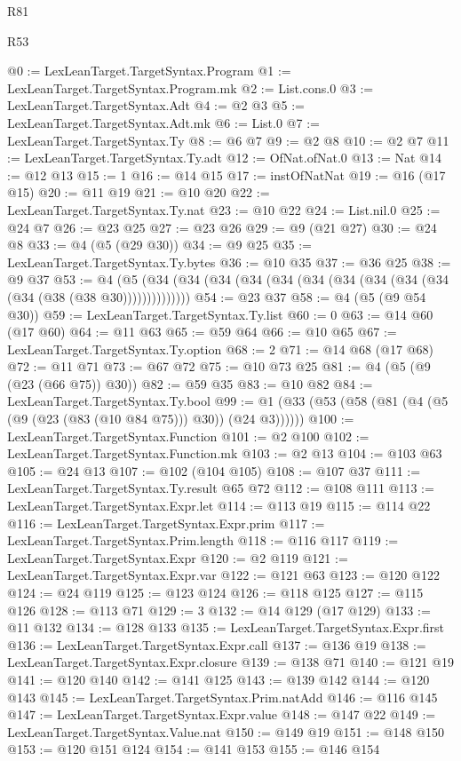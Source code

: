 \begin{lexlean}{R81}
\begin{lexlean}{R53}
\begin{coremodule}
{{{{{{{{{{{{{{{{{{{{{{{{{{{{{{{{{{{{{{{{{{{{{{{{{{{{{{{{{{{{{{{{{{{{{{{{{{{{{{{{{{{{{{{{{{{{{{{{{{{{{{{{{{{{{{{{@0 := LexLeanTarget.TargetSyntax.Program
@1 := LexLeanTarget.TargetSyntax.Program.mk
@2 := List.cons.{0}
@3 := LexLeanTarget.TargetSyntax.Adt
@4 := @2 @3
@5 := LexLeanTarget.TargetSyntax.Adt.mk
@6 := List.{0}
@7 := LexLeanTarget.TargetSyntax.Ty
@8 := @6 @7
@9 := @2 @8
@10 := @2 @7
@11 := LexLeanTarget.TargetSyntax.Ty.adt
@12 := OfNat.ofNat.{0}
@13 := Nat
@14 := @12 @13
@15 := 1
@16 := @14 @15
@17 := instOfNatNat
@19 := @16 (@17 @15)
@20 := @11 @19
@21 := @10 @20
@22 := LexLeanTarget.TargetSyntax.Ty.nat
@23 := @10 @22
@24 := List.nil.{0}
@25 := @24 @7
@26 := @23 @25
@27 := @23 @26
@29 := @9 (@21 @27)
@30 := @24 @8
@33 := @4 (@5 (@29 @30))
@34 := @9 @25
@35 := LexLeanTarget.TargetSyntax.Ty.bytes
@36 := @10 @35
@37 := @36 @25
@38 := @9 @37
@53 := @4 (@5 (@34 (@34 (@34 (@34 (@34 (@34 (@34 (@34 (@34 (@34 (@34 (@38 (@38 @30))))))))))))))
@54 := @23 @37
@58 := @4 (@5 (@9 @54 @30))
@59 := LexLeanTarget.TargetSyntax.Ty.list
@60 := 0
@63 := @14 @60 (@17 @60)
@64 := @11 @63
@65 := @59 @64
@66 := @10 @65
@67 := LexLeanTarget.TargetSyntax.Ty.option
@68 := 2
@71 := @14 @68 (@17 @68)
@72 := @11 @71
@73 := @67 @72
@75 := @10 @73 @25
@81 := @4 (@5 (@9 (@23 (@66 @75)) @30))
@82 := @59 @35
@83 := @10 @82
@84 := LexLeanTarget.TargetSyntax.Ty.bool
@99 := @1 (@33 (@53 (@58 (@81 (@4 (@5 (@9 (@23 (@83 (@10 @84 @75))) @30)) (@24 @3))))))
@100 := LexLeanTarget.TargetSyntax.Function
@101 := @2 @100
@102 := LexLeanTarget.TargetSyntax.Function.mk
@103 := @2 @13
@104 := @103 @63
@105 := @24 @13
@107 := @102 (@104 @105)
@108 := @107 @37
@111 := LexLeanTarget.TargetSyntax.Ty.result @65 @72
@112 := @108 @111
@113 := LexLeanTarget.TargetSyntax.Expr.let
@114 := @113 @19
@115 := @114 @22
@116 := LexLeanTarget.TargetSyntax.Expr.prim
@117 := LexLeanTarget.TargetSyntax.Prim.length
@118 := @116 @117
@119 := LexLeanTarget.TargetSyntax.Expr
@120 := @2 @119
@121 := LexLeanTarget.TargetSyntax.Expr.var
@122 := @121 @63
@123 := @120 @122
@124 := @24 @119
@125 := @123 @124
@126 := @118 @125
@127 := @115 @126
@128 := @113 @71
@129 := 3
@132 := @14 @129 (@17 @129)
@133 := @11 @132
@134 := @128 @133
@135 := LexLeanTarget.TargetSyntax.Expr.first
@136 := LexLeanTarget.TargetSyntax.Expr.call
@137 := @136 @19
@138 := LexLeanTarget.TargetSyntax.Expr.closure
@139 := @138 @71
@140 := @121 @19
@141 := @120 @140
@142 := @141 @125
@143 := @139 @142
@144 := @120 @143
@145 := LexLeanTarget.TargetSyntax.Prim.natAdd
@146 := @116 @145
@147 := LexLeanTarget.TargetSyntax.Expr.value
@148 := @147 @22
@149 := LexLeanTarget.TargetSyntax.Value.nat
@150 := @149 @19
@151 := @148 @150
@153 := @120 @151 @124
@154 := @141 @153
@155 := @146 @154
}}}}}}}}}}}}}}}}}}}}}}}}}}}}}}}}}}}}}}}}}}}}}}}}}}}}}}}}}}}}}}}}}}}}}}}}}}}}}}}}}}}}}}}}}}}}}}}}}}}}}}}}}}}}}}}}
\end{coremodule}
\end{lexlean}
\end{lexlean}
